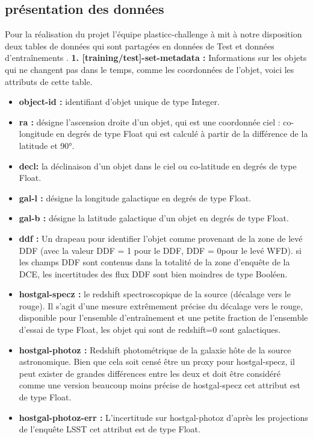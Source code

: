 \subsection{présentation des données}
Pour la réalisation du projet l’équipe plasticc-challenge à mit à notre disposition deux tables de données qui sont partagées en données de Test et données d’entraînements .
\newline
\newline
\textbf{1. [training/test]-set-metadata :} Informations sur les objets qui ne changent pas dans le temps, comme les coordonnées de l’objet, voici les attributs de cette table.
\begin{itemize}
    \item \textbf{object-id :} identifiant d’objet unique de type Integer.
    \item \textbf{ra :} désigne l’ascension droite d’un objet, qui est une coordonnée ciel : co-longitude en degrés de type Float qui est calculé à partir de la différence de la latitude et 90°.
    \item \textbf{ decl:} la déclinaison d’un objet dans le ciel ou co-latitude en degrés de type Float.
    \item \textbf{ gal-l :} désigne la longitude galactique en degrés de type Float.
    \item \textbf{gal-b : }désigne la latitude galactique d’un objet en degrés de type Float.
    \item \textbf{ ddf :} Un drapeau pour identifier l’objet comme provenant de la zone de levé DDF (avec la valeur DDF = 1 pour le DDF, DDF = 0pour le levé WFD). si les champs DDF sont contenus dans la totalité de la zone d’enquête de la DCE, les incertitudes des flux DDF sont bien moindres de type Booléen.
    \item \textbf{ hostgal-specz : }le redshift spectroscopique de la source (décalage vers le rouge). Il s’agit d’une mesure extrêmement précise du décalage vers le rouge, disponible pour l’ensemble d’entraînement et une petite fraction de l’ensemble d’essai de type Float, les objet qui sont de redshift=0 sont galactiques.
    \item \textbf{hostgal-photoz :} Redshift photométrique de la galaxie hôte de la source astronomique. Bien que cela soit censé être un proxy pour hostgal-specz, il peut exister de grandes différences entre les deux et doit être considéré comme une version beaucoup moins précise de hostgal-specz cet attribut est de type Float.
    \item \textbf{hostgal-photoz-err :} L’incertitude sur hostgal-photoz d’après les projections de l’enquête LSST cet attribut est de type Float.

\end{itemize}
